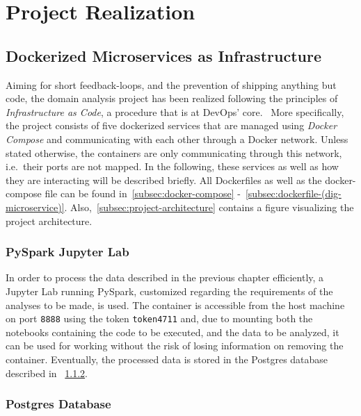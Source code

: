 \section{Project Realization}\label{sec:project-realization}

\subsection{Dockerized Microservices as Infrastructure}\label{subsec:dockerized-microservices-as-infrastructure}

Aiming for short feedback-loops, and the prevention of shipping anything but code, the domain analysis project has been realized following the principles of \textit{Infrastructure as Code}, a procedure that is at DevOps' core.~\autocite[cf.][p. 13]{Riti.2018}
More specifically, the project consists of five dockerized services that are
managed using \textit{Docker Compose} and communicating with each other through a Docker network.
Unless stated otherwise, the containers are only communicating through this network, i.e.\ their ports are not mapped.
In the following, these services as well as how they are interacting will be described briefly.
All Dockerfiles as well as the docker-compose file can be found in~\ref{subsec:docker-compose} -~\ref{subsec:dockerfile-(dig-microservice)}.
Also,~\ref{subsec:project-architecture} contains a figure visualizing the project architecture.

\subsubsection{PySpark Jupyter Lab}\label{subsubsec:pyspark-jupyter-lab}

In order to process the data described in the previous chapter efficiently, a Jupyter Lab running PySpark, customized regarding the requirements of the analyses to be made, is used.
The container is accessible from the host machine on port \texttt{8888} using the token \texttt{token4711} and, due to mounting both the notebooks containing the code to be executed,
and the data to be analyzed, it can be used for working without the risk of losing information on removing the container.
Eventually, the processed data is stored in the Postgres database described in ~\ref{subsubsec:postgres-database}.
%

\subsubsection{Postgres Database}\label{subsubsec:postgres-database}

